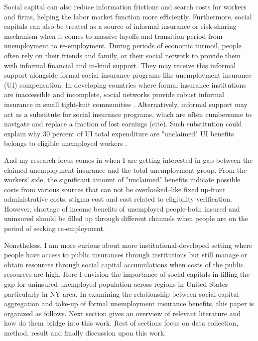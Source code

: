 \documentclass{article}
\begin{document}
Social capital can also reduce information frictions and search costs for workers and firms, helping the labor market function more efficiently. Furthermore, social capitals can also be treated as a source of informal insurance or risk-sharing mechanism when it comes to massive layoffs and transition period from unemployment to re-employment. During periods of economic turmoil, people often rely on their friends and family, or their social network to provide them with informal financial and in-kind support. They may receive this informal support alongside formal social insurance programs like unemployment insurance (UI) compensation. In developing countries where formal insurance institutions are inaccessible and incomplete, social networks provide robust informal insurance in small tight-knit communities \cite{microfinance}. Alternatively, informal support may act as a substitute for social insurance programs, which are often cumbersome to navigate and replace a fraction of lost earnings (cite). Such substitution could explain why 30 percent of UI total expenditure are "unclaimed" UI benefits belongs to eligible unemployed workers \cite{gap_takeup}.

And my research focus comes in when I are getting interested in gap between the claimed unemployment insurance and the total unemployment group. From the workers' side, the significant amount of "unclaimed" benefits indicate possible costs from various sources that can not be overlooked--like fixed up-front administrative costs, stigma cost and cost related to eligibility verification. However, shortage of income benefits of unemployed people-both insured and uninsured should be filled up through different channels when people are on the period of seeking re-employment. 


Nonetheless, I am more curious about more institutional-developed setting where people have access to public insurances through institutions but still manage or obtain resources through social capital accumulations when costs of the public resources are high. Here I envision the importance of social capitals in filling the gap for uninsured unemployed population across regions in United States particularly in NY area. In examining the relationship between social capital aggregation and take-up of formal unemployment insurance benefits, this paper is organized as follows. Next section gives an overview of relevant literature and how do them bridge into this work. Rest of sections focus on data collection, method, result and finally discussion upon this work.
\end{document}
